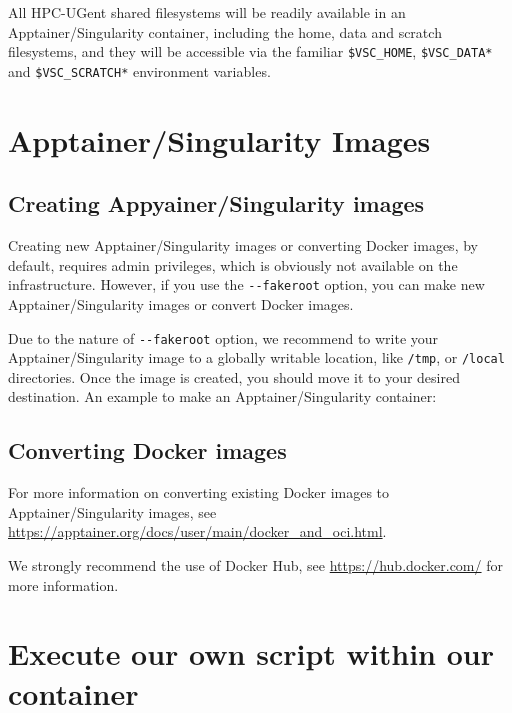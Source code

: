 All HPC-UGent shared filesystems will be readily available in an Apptainer/Singularity container,
including the home, data and scratch filesystems, and they will be accessible via the
familiar \lstinline|$VSC_HOME|, \lstinline|$VSC_DATA*| and \lstinline|$VSC_SCRATCH*| environment variables.

\section{Apptainer/Singularity Images}

\subsection{Creating Appyainer/Singularity images}

Creating new Apptainer/Singularity images or converting Docker images, by default, requires admin privileges,
which is obviously not available on the \hpcInfra infrastructure. However,
if you use the \lstinline|--fakeroot| option, you can make new Apptainer/Singularity images or convert 
Docker images. 

Due to the nature of \lstinline|--fakeroot| option, we recommend to write your Apptainer/Singularity
image to a globally writable location, like \lstinline|/tmp|, or \lstinline|/local| directories. 
Once the image is created, you should move it to your desired destination.
An example to make an Apptainer/Singularity container:

\begin{prompt}
\end{prompt}

\subsection{Converting Docker images}

For more information on converting existing Docker images to Apptainer/Singularity images,
see \url{https://apptainer.org/docs/user/main/docker_and_oci.html}.

We strongly recommend the use of Docker Hub, see \url{https://hub.docker.com/} for more information.

\section{Execute our own script within our container}

